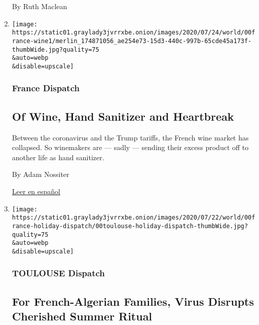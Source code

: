 \begin{enumerate}
  By Ruth Maclean
\item
  \href{/2020/07/27/world/europe/france-alsace-wine-coronavirus.html}{}

  \texttt{[image: https://static01.graylady3jvrrxbe.onion/images/2020/07/24/world/00france-wine1/merlin\_174871056\_ae254e73-15d3-440c-997b-65cde45a173f-thumbWide.jpg?quality=75\\\&auto=webp\\\&disable=upscale]}

  \hypertarget{france-dispatch}{%
  \subsubsection{France Dispatch}\label{france-dispatch}}

  \hypertarget{of-wine-hand-sanitizer-and-heartbreak}{%
  \subsection{Of Wine, Hand Sanitizer and
  Heartbreak}\label{of-wine-hand-sanitizer-and-heartbreak}}

  Between the coronavirus and the Trump tariffs, the French wine market
  has collapsed. So winemakers are --- sadly --- sending their excess
  product off to another life as hand sanitizer.

  By Adam Nossiter

  \href{https://www.nytimes3xbfgragh.onion/es/2020/07/28/espanol/mundo/vino-blanco-alsacia-coronavirus.html}{Leer
  en español}
\item
  \href{/2020/07/26/world/europe/france-algeria-summer-vacations.html}{}

  \texttt{[image: https://static01.graylady3jvrrxbe.onion/images/2020/07/22/world/00france-holiday-dispatch/00toulouse-holiday-dispatch-thumbWide.jpg?quality=75\\\&auto=webp\\\&disable=upscale]}

  \hypertarget{toulouse-dispatch}{%
  \subsubsection{TOULOUSE Dispatch}\label{toulouse-dispatch}}

  \hypertarget{for-french-algerian-families-virus-disrupts-cherished-summer-ritual}{%
  \subsection{For French-Algerian Families, Virus Disrupts Cherished
  Summer
  Ritual}\label{for-french-algerian-families-virus-disrupts-cherished-summer-ritual}}


\end{enumerate}
